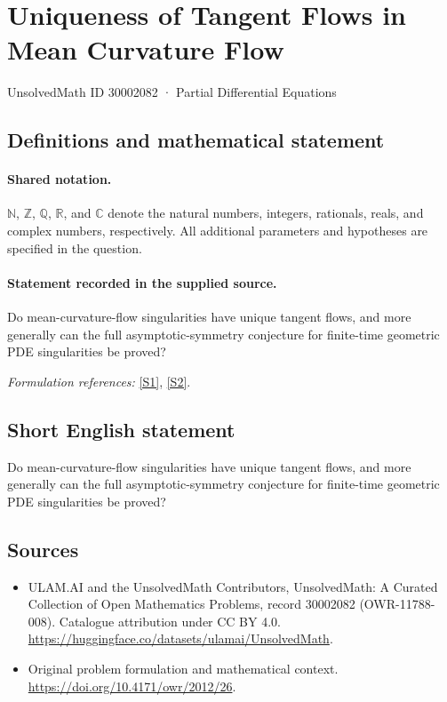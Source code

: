 \documentclass[11pt]{article}
\newcommand{\sref}[2]{\hyperlink{source:#1:#2}{[S#2]}}
\begin{document}
\setcounter{section}{30002081}
\section{Uniqueness of Tangent Flows in Mean Curvature Flow}\label{30002082}
{\small UnsolvedMath ID 30002082 · Partial Differential Equations}
\subsection{Definitions and mathematical statement}

\paragraph{Shared notation.}$\mathbb N$, $\mathbb Z$, $\mathbb Q$, $\mathbb R$, and $\mathbb C$ denote the natural numbers, integers, rationals, reals, and complex numbers, respectively. All additional parameters and hypotheses are specified in the question.


\paragraph{Statement recorded in the supplied source.}
Do mean-curvature-flow singularities have unique tangent flows, and more generally can the full asymptotic-symmetry conjecture for finite-time geometric PDE singularities be proved?
\par\smallskip\textit{Formulation references:} \sref{30002082}{1}, \sref{30002082}{2}.
\subsection{Short English statement}
Do mean-curvature-flow singularities have unique tangent flows, and more generally can the full asymptotic-symmetry conjecture for finite-time geometric PDE singularities be proved?
\subsection{Sources}
\begin{itemize}
\item[\hypertarget{source:30002082:1}{S1}] ULAM.AI and the UnsolvedMath Contributors, UnsolvedMath: A Curated Collection of Open Mathematics Problems, record 30002082 (OWR-11788-008). Catalogue attribution under CC BY 4.0.
\url{https://huggingface.co/datasets/ulamai/UnsolvedMath}.
\item[\hypertarget{source:30002082:2}{S2}] Original problem formulation and mathematical context.
\url{https://doi.org/10.4171/owr/2012/26}.
\end{itemize}
\label{end:30002082}
\end{document}
